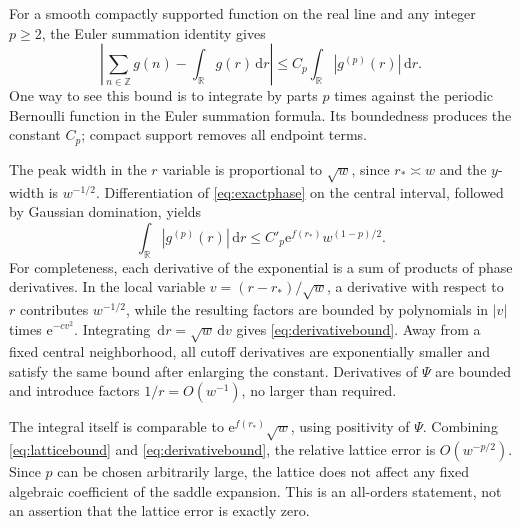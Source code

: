 \documentclass[11pt,oneside]{article}
\numberwithin{equation}{section}
\theoremstyle{definition}
\theoremstyle{remark}
\newcommand{\ZZ}{\mathbb Z}
\newcommand{\RR}{\mathbb R}
\newcommand{\dd}{\,\mathrm d}
\newcommand{\e}{\mathrm e}
\begin{document}
For a smooth compactly supported function on the real line and any integer
\(p\ge2\), the Euler summation identity gives
\begin{equation}
 \left|\sum_{n\in\ZZ}g(n)-\int_\RR g(r)\dd r\right|
 \le C_p\int_\RR|g^{(p)}(r)|\dd r.
 \label{eq:latticebound}
\end{equation}
One way to see this bound is to integrate by parts \(p\) times against the
periodic Bernoulli function in the Euler summation formula. Its boundedness
produces the constant \(C_p\); compact support removes all endpoint terms.

The peak width in the \(r\) variable is proportional to \(\sqrt w\), since
\(r_*\asymp w\) and the \(y\)-width is \(w^{-1/2}\). Differentiation of
\eqref{eq:exactphase} on the central interval, followed by Gaussian domination,
yields
\begin{equation}
 \int_\RR|g^{(p)}(r)|\dd r
 \le C'_p\e^{f(r_*)}w^{(1-p)/2}.
 \label{eq:derivativebound}
\end{equation}
For completeness, each derivative of the exponential is a sum of products of
phase derivatives. In the local variable \(v=(r-r_*)/\sqrt w\), a derivative
with respect to \(r\) contributes \(w^{-1/2}\), while the resulting factors
are bounded by polynomials in \(|v|\) times \(\e^{-c v^2}\). Integrating
\(\dd r=\sqrt w\dd v\) gives \eqref{eq:derivativebound}. Away from a fixed
central neighborhood, all cutoff derivatives are exponentially smaller and
satisfy the same bound after enlarging the constant. Derivatives of \(\Psi\)
are bounded and introduce factors \(1/r=O(w^{-1})\), no larger than required.

The integral itself is comparable to \(\e^{f(r_*)}\sqrt w\), using positivity
of \(\Psi\). Combining \eqref{eq:latticebound} and
\eqref{eq:derivativebound}, the relative lattice error is \(O(w^{-p/2})\).
Since \(p\) can be chosen arbitrarily large, the lattice does not affect any
fixed algebraic coefficient of the saddle expansion. This is an all-orders
statement, not an assertion that the lattice error is exactly zero.
\end{document}
